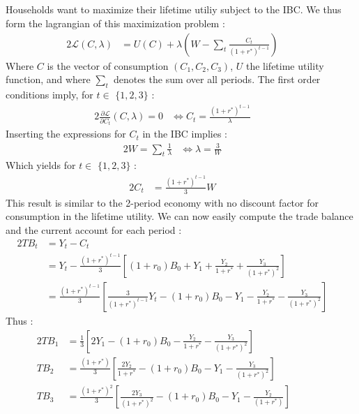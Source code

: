 \documentclass{article}
\begin{document}
\subsection{}
Households want to maximize their lifetime utiliy subject to the IBC. We thus form the lagrangian of this maximization problem :
\begin{alignat}{2}
    \mathcal{L}(C,\lambda) &= U(C) + \lambda(W - \sum_t \frac{C_t}{(1+r^*)^{t-1}}) \quad&
\end{alignat}
Where $C$ is the vector of consumption $(C_1, C_2, C_3)$, $U$ the lifetime utility function, and where $\displaystyle\sum_t$ denotes the sum over all periods.\newline
The first order conditions imply, for $t \in$ $\{ 1, 2, 3\}$ :
\begin{alignat*}{2}
    \frac{\partial\mathcal{L}}{\partial C_t} (C,\lambda) = 0 &\iff C_t = \frac{(1+r^*)^{t-1}}{\lambda} \quad&
\end{alignat*}
Inserting the expressions for $C_t$ in the IBC implies :
\begin{alignat}{2}
    W = \sum_t \frac{1}{\lambda} &\iff \lambda = \frac{3}{W}\quad&
\end{alignat}
Which yields for $t \in$ $\{ 1, 2, 3\}$ :
\begin{alignat}{2}
    C_t &= \frac{(1+r^*)^{t-1}}{3}W\quad&
\end{alignat}
This result is similar to the 2-period economy with no discount factor for consumption in the lifetime utility.\newline
We can now easily compute the trade balance and the current account for each period :
\begin{alignat*}{2}
    TB_t &= Y_t - C_t\quad&\\
    &= Y_t - \frac{(1+r^*)^{t-1}}{3} \left[ (1+r_0)B_0 + Y_1 + \frac{Y_2}{1+r^*} + \frac{Y_3}{(1+r^*)^2} \right]\quad&\\
    &= \frac{(1+r^*)^{t-1}}{3} \left[\frac{3}{(1+r^*)^{t-1}}Y_t - (1+r_0)B_0 - Y_1 - \frac{Y_2}{1+r^*} - \frac{Y_3}{(1+r^*)^2} \right]\quad&
\end{alignat*}
Thus :
\begin{alignat}{2}
    TB_1 &= \frac{1}{3} \left[2 Y_1 -(1+r_0)B_0 - \frac{Y_2}{1+r^*} - \frac{Y_3}{(1+r^*)^2} \right]\quad&\quad&\\
    TB_2 &= \frac{(1+r^*)}{3} \left[\frac{2Y_2}{1+r^*} - (1+r_0)B_0 - Y_1 - \frac{Y_3}{(1+r^*)^2} \right]\quad&\\
    TB_3 &= \frac{(1+r^*)^2}{3} \left[\frac{2Y_3}{(1+r^*)^2} - (1+r_0)B_0 - Y_1 - \frac{Y_2}{(1+r^*)} \right]\quad&
\end{alignat}
\end{document}
